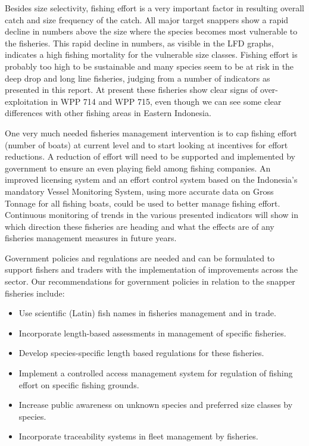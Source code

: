 Besides size selectivity, fishing effort is a very important factor in resulting overall catch and size frequency of the catch. All major target snappers show a rapid decline in numbers above the size where the species becomes most vulnerable to the fisheries. This rapid decline in numbers, as visible in the LFD graphs, indicates a high fishing mortality for the vulnerable size classes. Fishing effort is probably too high to be sustainable and many species seem to be at risk in the deep drop and long line fisheries, judging from a number of indicators as presented in this report. At present these fisheries show clear signs of over-exploitation in WPP 714 and WPP 715, even though we can see some clear differences with other fishing areas in Eastern Indonesia.

One very much needed fisheries management intervention is to cap fishing effort (number of boats) at current level and to start looking at incentives for effort reductions. A reduction of effort will need to be supported and implemented by government to ensure an even playing field among fishing companies. An improved licensing system and an effort control system based on the Indonesia's mandatory Vessel Monitoring System, using more accurate data on Gross Tonnage for all fishing boats, could be used to better manage fishing effort. Continuous monitoring of trends in the various presented indicators will show in which direction these fisheries are heading and what the effects are of any fisheries management measures in future years.

Government policies and regulations are needed and can be formulated to support fishers and traders with the implementation of improvements across the sector. Our recommendations for government policies in relation to the snapper fisheries include:
\parskip=1pt
\begin{itemize}[noitemsep,topsep=0pt,parsep=0pt,partopsep=0pt]
\item Use scientific (Latin) fish names in fisheries management and in trade.
\item Incorporate length-based assessments in management of specific fisheries.
\item Develop species-specific length based regulations for these fisheries.
\item Implement a controlled access management system for regulation of fishing effort on specific fishing grounds.
\item Increase public awareness on unknown species and preferred size classes by species.
\item Incorporate traceability systems in fleet management by fisheries.
\end{itemize}

